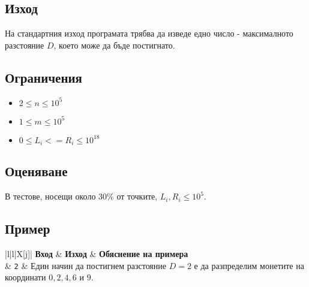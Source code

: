 \documentclass[12pt]{article}
\begin{document}
\subsection{Изход}

На стандартния изход програмата трябва да изведе едно число - максималното разстояние $D$, което може да бъде постигнато.


\subsection{Ограничения}

\vspace{0.1em}
\begin{itemize}
	\item $2 \leq  n \leq 10^5$
    \item $1 \leq  m \leq  10^5$ 
    \item $0 \leq L_i <= R_i \leq 10^{18}$ 
\end{itemize}

\subsection{Оценяване}
В тестове, носещи около $30\%$ от точките, $L_i, R_i \leq 10^5$.

\subsection{Пример}

\begin{table}[ht]
	\begin{tblr}{|l|l|X[j]|}
		\hline
		\textbf{Вход} & \textbf{Изход} & \textbf{Обяснение на примера}\\
		\hline
		\texttt
            {} & \texttt{2} & Един начин да постигнем разстояние $D = 2$ е да разпределим монетите на координати $0, 2, 4, 6$ и $9$.\\
		\hline
	\end{tblr}
\end{table}
\end{document}
